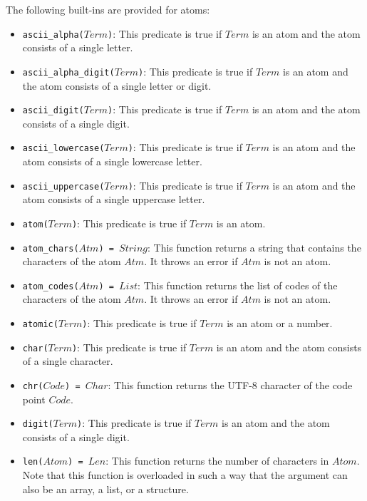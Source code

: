 The following built-ins are provided for atoms:
\begin{itemize}
\item \texttt{ascii\_alpha($Term$)}: This predicate is true if $Term$ is an atom and the atom consists of a single letter.
\item \texttt{ascii\_alpha\_digit($Term$)}: This predicate is true if $Term$ is an atom and the atom consists of a single letter or digit.
\item \texttt{ascii\_digit($Term$)}: This predicate is true if $Term$ is an atom and the atom consists of a single digit.
\item \texttt{ascii\_lowercase($Term$)}: This predicate is true if $Term$ is an atom and the atom consists of a single lowercase letter.
\item \texttt{ascii\_uppercase($Term$)}: This predicate is true if $Term$ is an atom and the atom consists of a single uppercase letter.
\item \texttt{atom($Term$)}: This predicate is true if $Term$ is an atom.
\item \texttt{atom\_chars($Atm$) = $String$}: This function returns a string that contains the characters of the atom $Atm$. It throws an error if $Atm$ is not an atom.
\item \texttt{atom\_codes($Atm$) = $List$}: This function returns the list of codes of the characters of the atom $Atm$. It throws an error if $Atm$ is not an atom. 
\item \texttt{atomic($Term$)}: This predicate is true if $Term$ is an atom or a number.
\item \texttt{char($Term$)}: This predicate is true if $Term$ is an atom and the atom consists of a single character.
\item \texttt{chr($Code$) = $Char$}: This function returns the UTF-8 character of the code point $Code$.  
\item \texttt{digit($Term$)}: This predicate is true if $Term$ is an atom and the atom consists of a single digit.
\item \texttt{len($Atom$) = $Len$}: This function returns the number of characters in $Atom$. Note that this function is overloaded in such a way that the argument can also be an array, a list, or a structure.

\end{itemize}
